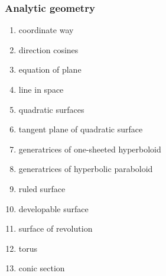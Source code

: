 \documentclass[12pt]{article}
\theoremstyle{definition}
\begin{document}
\subsubsection*{Analytic geometry}
\begin{enumerate}
\item coordinate way
\item direction cosines
\item equation of plane
\item line in space
\item quadratic surfaces
\item tangent plane of quadratic surface
\item generatrices of one-sheeted hyperboloid
\item generatrices of hyperbolic paraboloid
\item ruled surface
\item developable surface
\item surface of revolution
\item torus
\item conic section
\end{enumerate}
\end{document}
